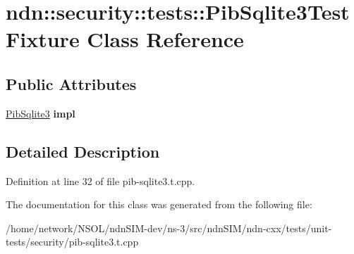 \hypertarget{classndn_1_1security_1_1tests_1_1PibSqlite3TestFixture}{}\section{ndn\+:\+:security\+:\+:tests\+:\+:Pib\+Sqlite3\+Test\+Fixture Class Reference}
\label{classndn_1_1security_1_1tests_1_1PibSqlite3TestFixture}
\subsection*{Public Attributes}
\begin{DoxyCompactItemize}
\item 
\hyperlink{classndn_1_1security_1_1PibSqlite3}{Pib\+Sqlite3} {\bfseries impl}\hypertarget{classndn_1_1security_1_1tests_1_1PibSqlite3TestFixture_ae7dcbb12b605aa378e7399cd44d9841f}{}\label{classndn_1_1security_1_1tests_1_1PibSqlite3TestFixture_ae7dcbb12b605aa378e7399cd44d9841f}

\end{DoxyCompactItemize}


\subsection{Detailed Description}


Definition at line 32 of file pib-\/sqlite3.\+t.\+cpp.



The documentation for this class was generated from the following file\+:\begin{DoxyCompactItemize}
\item 
/home/network/\+N\+S\+O\+L/ndn\+S\+I\+M-\/dev/ns-\/3/src/ndn\+S\+I\+M/ndn-\/cxx/tests/unit-\/tests/security/pib-\/sqlite3.\+t.\+cpp\end{DoxyCompactItemize}
